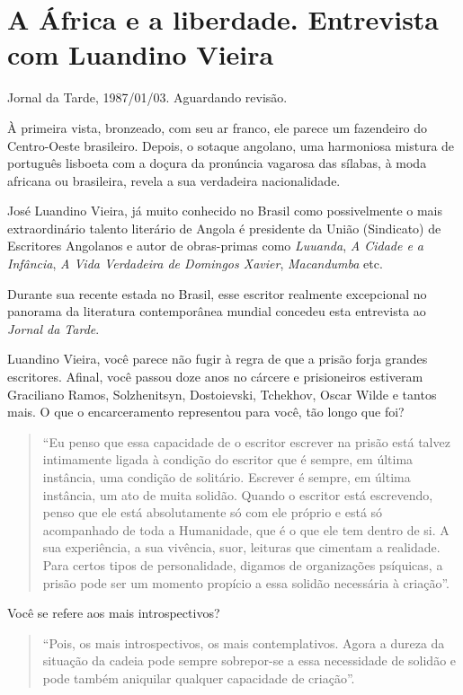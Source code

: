 \documentclass[
  letterpaper,
  DIV=11,
  numbers=noendperiod]{scrreprt}
\begin{document}
\chapter{A África e a liberdade. Entrevista com Luandino
Vieira}\label{a-uxe1frica-e-a-liberdade.-entrevista-com-luandino-vieira}

Jornal da Tarde, 1987/01/03. Aguardando revisão.

\hfill\break

À primeira vista, bronzeado, com seu ar franco, ele parece um fazendeiro
do Centro-Oeste brasileiro. Depois, o sotaque angolano, uma harmoniosa
mistura de português lisboeta com a doçura da pronúncia vagarosa das
sílabas, à moda africana ou brasileira, revela a sua verdadeira
nacionalidade.

José Luandino Vieira, já muito conhecido no Brasil como possivelmente o
mais extraordinário talento literário de Angola é presidente da União
(Sindicato) de Escritores Angolanos e autor de obras-primas como
\emph{Luuanda}, \emph{A Cidade e a Infância}, \emph{A Vida Verdadeira de
Domingos Xavier}, \emph{Macandumba} etc.

Durante sua recente estada no Brasil, esse escritor realmente
excepcional no panorama da literatura contemporânea mundial concedeu
esta entrevista ao \emph{Jornal da Tarde}.

Luandino Vieira, você parece não fugir à regra de que a prisão forja
grandes escritores. Afinal, você passou doze anos no cárcere e
prisioneiros estiveram Graciliano Ramos, Solzhenitsyn, Dostoievski,
Tchekhov, Oscar Wilde e tantos mais. O que o encarceramento representou
para você, tão longo que foi?

\begin{quote}
``Eu penso que essa capacidade de o escritor escrever na prisão está
talvez intimamente ligada à condição do escritor que é sempre, em última
instância, uma condição de solitário. Escrever é sempre, em última
instância, um ato de muita solidão. Quando o escritor está escrevendo,
penso que ele está absolutamente só com ele próprio e está só
acompanhado de toda a Humanidade, que é o que ele tem dentro de si. A
sua experiência, a sua vivência, suor, leituras que cimentam a
realidade. Para certos tipos de personalidade, digamos de organizações
psíquicas, a prisão pode ser um momento propício a essa solidão
necessária à criação''.
\end{quote}

Você se refere aos mais introspectivos?

\begin{quote}
``Pois, os mais introspectivos, os mais contemplativos. Agora a dureza
da situação da cadeia pode sempre sobrepor-se a essa necessidade de
solidão e pode também aniquilar qualquer capacidade de criação''.
\end{quote}
\end{document}
